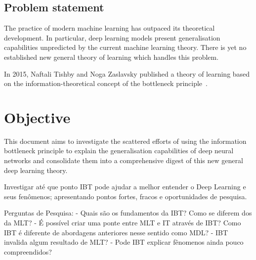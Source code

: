 \subsection{Problem statement} The practice of modern machine learning has outpaced its theoretical development. In particular, deep learning models present generalisation capabilities unpredicted by the current machine learning theory. There is yet no established new general theory of learning which handles this problem.

In 2015, Naftali Tishby and Noga Zaslavsky published a theory of learning based on the information-theoretical concept of the bottleneck principle~\cite{tishby:2015dlib}.



\section{Objective}

This document aims to investigate the scattered efforts of using the information bottleneck principle to explain the generalisation capabilities of deep neural networks and consolidate them into a comprehensive digest of this new general deep learning theory.

Investigar até que ponto  IBT pode ajudar a melhor entender o Deep Learning e seus fenômenos; apresentando pontos fortes, fracos e oportunidades de pesquisa.

Perguntas de Pesquisa:
- Quais são os fundamentos da IBT? Como se diferem dos da MLT?
- É possível criar uma ponte entre MLT e IT através de IBT? Como IBT é diferente de abordagens anteriores nesse sentido como MDL?
- IBT invalida algum resultado de MLT?
- Pode IBT explicar fênomenos ainda pouco compreendidos?

